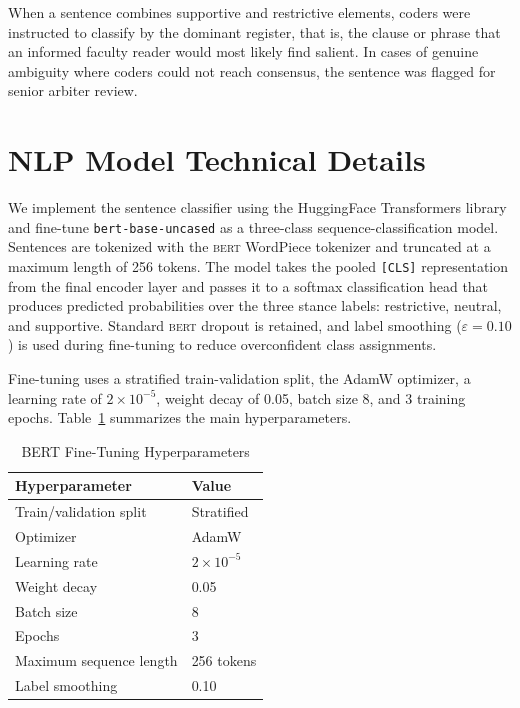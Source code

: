 \documentclass[12pt]{article}
\newcommand{\BERT}{\textsc{bert}}
\begin{document}
\begin{appendices}
When a sentence combines supportive and restrictive elements, coders were instructed
to classify by the dominant register, that is, the clause or phrase that an informed
faculty reader would most likely find salient.  In cases of genuine ambiguity where
coders could not reach consensus, the sentence was flagged for senior arbiter review.

\section{NLP Model Technical Details}
\label{app:nlp}

We implement the sentence classifier using the HuggingFace Transformers library and
fine-tune \texttt{bert-base-uncased} as a three-class sequence-classification model.
Sentences are tokenized with the \BERT{} WordPiece tokenizer and truncated at a
maximum length of 256 tokens. The model takes the pooled \texttt{[CLS]} representation
from the final encoder layer and passes it to a softmax classification head that
produces predicted probabilities over the three stance labels: restrictive, neutral,
and supportive. Standard \BERT{} dropout is retained, and label smoothing
($\varepsilon = 0.10$) is used during fine-tuning to reduce overconfident class
assignments.

Fine-tuning uses a stratified train-validation split, the AdamW optimizer, a learning
rate of $2 \times 10^{-5}$, weight decay of 0.05, batch size 8, and 3 training
epochs. Table~\ref{tab:nlp_hyperparams} summarizes the main hyperparameters.

\begin{table}[H]
\centering
\caption{BERT Fine-Tuning Hyperparameters}
\label{tab:nlp_hyperparams}
\begin{tabular}{ll}
\toprule
\textbf{Hyperparameter} & \textbf{Value} \\
\midrule
Train/validation split      & Stratified \\
Optimizer                   & AdamW \\
Learning rate               & $2 \times 10^{-5}$ \\
Weight decay                & 0.05 \\
Batch size                  & 8 \\
Epochs                      & 3 \\
Maximum sequence length     & 256 tokens \\
Label smoothing             & 0.10 \\
\bottomrule
\end{tabular}
\end{table}


\end{appendices}
\end{document}
